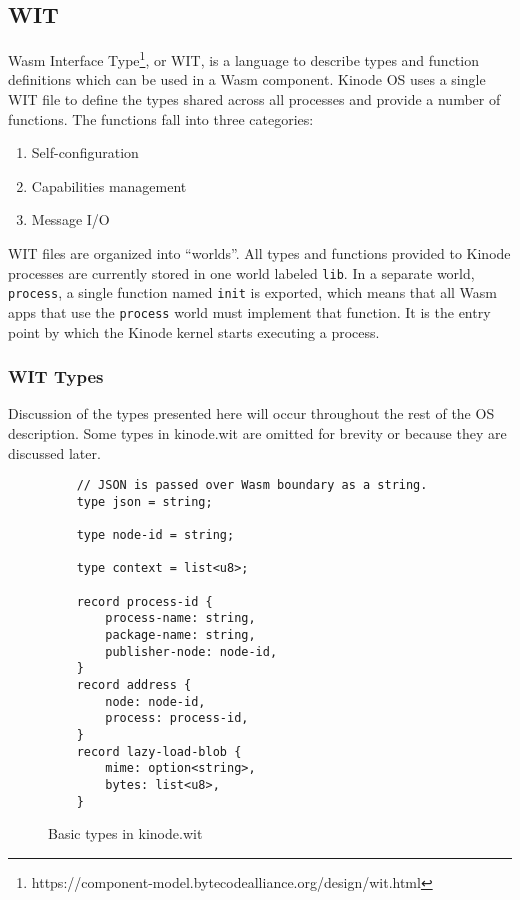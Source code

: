 \documentclass[runningheads]{llncs}
\begin{document}
\subsection{WIT}
\label{sec:oswit}

Wasm Interface Type\footnote{https://component-model.bytecodealliance.org/design/wit.html}, or WIT, is a language to describe types and function definitions which can be used in a Wasm component.
Kinode OS uses a single WIT file to define the types shared across all processes and provide a number of functions.
The functions fall into three categories:
\begin{enumerate}
    \item Self-configuration
    \item Capabilities management
    \item Message I/O
\end{enumerate}

WIT files are organized into ``worlds''. All types and functions provided to Kinode processes are currently stored in one world labeled \verb|lib|.
In a separate world, \verb|process|, a single function named \verb|init| is exported, which means that all Wasm apps that use the \verb|process| world must implement that function.
It is the entry point by which the Kinode kernel starts executing a process.

\subsubsection{WIT Types}
\label{sec:oswittypes}

Discussion of the types presented here will occur throughout the rest of the OS description.
Some types in kinode.wit are omitted for brevity or because they are discussed later.

\begin{figure}[H]
    \centering
    \begin{verbatim}
    // JSON is passed over Wasm boundary as a string.
    type json = string;

    type node-id = string;

    type context = list<u8>;

    record process-id {
        process-name: string,
        package-name: string,
        publisher-node: node-id,
    }
    record address {
        node: node-id,
        process: process-id,
    }
    record lazy-load-blob {
        mime: option<string>,
        bytes: list<u8>,
    }
    \end{verbatim}
    \caption{Basic types in kinode.wit}
    \label{fig:WIT Types 1}
\end{figure}
\end{document}
